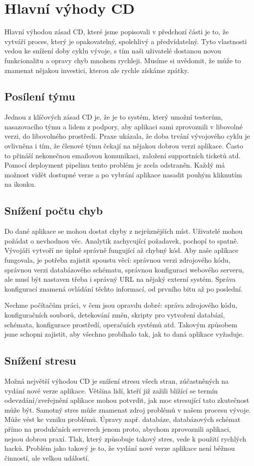 \section{Hlavní výhody CD}
Hlavní výhodou zásad CD, které jsme popisovali v předchozí části je to, že vytváří proces, který je opakovatelný, spolehlivý a předvídatelný. Tyto vlastnosti vedou ke snížení doby cyklu vývoje, s tím naši uživatelé dostanou novou funkcionalitu a opravy chyb mnohem rychleji. Musíme si uvědomit, že může to znamenat nějakou investici, kterou ale rychle získáme zpátky.

\subsection{Posílení týmu}
Jednou z klíčových zásad CD je, že je to systém, který umožní testerům, nasazovacího týmu a lidem z podpory, aby aplikaci sami zprovoznili v libovolné verzi, do libovolného prostředí. Praxe ukázala, že doba trvání vývojového cyklu je ovlivněna i tím, že členové týmu čekají na nějakou dobrou verzi aplikace. Často to přináší nekonečnou emailovou komunikaci, založení supportních ticketů atd. Pomocí deployment pipelinu tento problém je zcela odstraněn. Každý má možnost vidět dostupné verze a po vybrání aplikace nasadit pouhým kliknutím na ikonku.

\subsection{Snížení počtu chyb}
Do dané aplikace se mohou dostat chyby z nejrůznějších míst. Uživatelé mohou požádat o nevhodnou věc. Analytik zachycující požadavek, pochopí to spatně. Vývojáři vytvoří ne úplně správně fungující až chybný kód. 
Aby naše aplikace fungovala, je potřeba zajistit spoustu věcí: správnou verzi zdrojového kódu, správnou verzi databázového schématu, správnou konfiguraci webového serveru, ale musí být nastaven třeba i správný URL na nějaký externí systém. Správa konfigurací znamená ovládání těchto informací, od prvního bitu až po poslední.

Nechme počítačům práci, v čem jsou opravdu dobré: správa zdrojového kódu, konfiguračních souborů, detekování změn, skripty pro vytvoření databází, schémata, konfigurace prostředí, operačních systémů atd. Takovým způsobem jsme schopni zajistit, aby všechno probíhalo tak, jak to daná aplikace vyžaduje.

\subsection{Snížení stresu}
Možná největší výhodou CD je snížení stresu všech stran, zúčastněných na vydání nové verze aplikace. Většina lidí, kteří již zažili blížící se termín odevzdání/zveřejnění aplikace mohou potvrdit, jak moc stresující tato zkutečnost může být. Samotný stres může znamenat zdroj problémů v našem procesu vývoje. Může vést ke vzniku problémů. Úpravy např. databáze, databázových schémat přímo na produkčních serverech jenom proto, abychom zprovoznili aplikaci, nejsou dobrou praxí. 
Tlak, který způsobuje takový stres, vede k použití rychlých hacků. Problém jako takový je to, že vydání nové verze aplikace není běžnou činností, ale velkou událostí.

